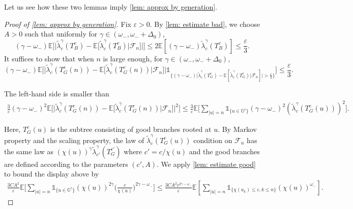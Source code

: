 \documentclass[12pt]{article}
\numberwithin{equation}{section}
\theoremstyle{plain}
\theoremstyle{definition}
\begin{document}
Let us see how these two lemmas imply \cref{lem: approx by generation}.

\begin{proof}[Proof of \cref{lem: approx by generation}]
Fix $\varepsilon>0$. By \cref{lem: estimate bad}, we choose $A>0$ such that uniformly for $\gamma\in(\omega_-, \omega_-+\Delta_0)$,
\[(\gamma-\omega_-)\mathbb{E}\Big[\Big|\tilde{\lambda}^{\gamma}_c(T^c_B) - \mathbb{E}\big[\tilde{\lambda}^{\gamma}_c(T^c_B)\big| \mathcal{F}_n\big]\Big|\Big]\leq 2\mathbb{E}[(\gamma-\omega_-)\tilde{\lambda}^{\gamma}_c(T^c_B)] \leq \frac{\varepsilon}{3}. \]
\noindent It suffices to show that when $n$ is large enough, for $\gamma \in (\omega_-, \omega_-+\Delta_0)$,
\begin{equation}\label{eq: pass to generatio n}
(\gamma-\omega_-)\mathbb{E}\Big[\Big|\tilde{\lambda}^{\gamma}_c(T^c_G(n)) - \mathbb{E}\big[\tilde{\lambda}^{\gamma}_c(T^c_G(n))\big| \mathcal{F}_n\big]\Big| \mathds{1}_{\big\{(\gamma-\omega_-)\big|\tilde{\lambda}^{\gamma}_c(T^c_G) - \mathbb{E}[\tilde{\lambda}^{\gamma}_c(T^c_G)| \mathcal{F}_n]\big|>\frac{\varepsilon}{3}\big\}}\Big] \leq \frac{\varepsilon}{3}.
\end{equation}

\noindent The left-hand side is smaller than
\begin{multline*}
\frac{3}{\varepsilon}(\gamma-\omega_-)^2\mathbb{E}\Big[\Big|\tilde{\lambda}^{\gamma}_c(T^c_G(n)) - \mathbb{E}\big[\tilde{\lambda}^{\gamma}_c(T^c_G(n))\big|\mathcal{F}_n\big]\Big|^2\Big]
\leq \frac{3}{\varepsilon}\mathbb{E}\bigg[\sum_{|u|=n}\mathds{1}_{\{u\in\mathbb{G}^c\}}(\gamma-\omega_-)^2(\tilde{\lambda}^{\gamma}_c(T^c_G(u)))^2\bigg].
\end{multline*}

\noindent Here, $T^c_G(u)$ is the subtree consisting of good branches rooted at $u$. By Markov property and the scaling property, the law of $\tilde{\lambda}^{\gamma}_c(T^c_G(u))$ condition on $\mathcal{F}_n$ has the same law as $(\chi(u))^{\gamma}\tilde{\lambda}^{\gamma}_{c'}(T^{c'}_G)$ where $c' = c/\chi(u)$ and the good branches are defined according to the parameters $(c', A)$. We apply \cref{lem: estimate good} to bound the display above by
\begin{eqnarray*}
\frac{3CA^2}{\varepsilon}\mathbb{E}\Bigg[\sum_{|u|=n}\mathds{1}_{\{u\in\mathbb{G}^c\}} (\chi(u))^{2\gamma}\Big(\frac{c}{\chi(u)}\Big)^{2\gamma-\omega_-}\Bigg]
\leq\frac{3CA^2c^{2\gamma-\omega_-}}{\varepsilon}\mathbb{E}\left[\sum_{|u|=n}\mathds{1}_{\{\chi(u_k)\leq c, k\leq n\}} (\chi(u))^{\omega_-}\right].
\end{eqnarray*}


\end{proof}
\end{document}
